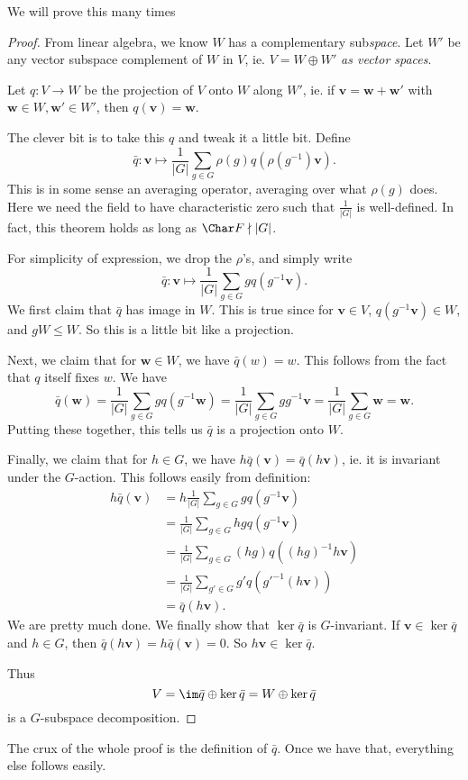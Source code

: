 \documentclass[a4paper]{article}
\begin{document}
We will prove this many times
\begin{proof}
  From linear algebra, we know $W$ has a complementary sub\emph{space}. Let $W'$ be any vector subspace complement of $W$ in $V$, ie. $V = W \oplus W'$ \emph{as vector spaces}.

  Let $q: V \to W$ be the projection of $V$ onto $W$ along $W'$, ie. if $\mathbf{v} = \mathbf{w} + \mathbf{w}'$ with $\mathbf{w} \in W, \mathbf{w}' \in W'$, then $q(\mathbf{v}) = \mathbf{w}$.

  The clever bit is to take this $q$ and tweak it a little bit. Define
  \[
    \bar{q}: \mathbf{v} \mapsto \frac{1}{|G|} \sum_{g \in G} \rho(g) q (\rho(g^{-1})\mathbf{v}).
  \]
  This is in some sense an averaging operator, averaging over what $\rho(g)$ does. Here we need the field to have characteristic zero such that $\frac{1}{|G|}$ is well-defined. In fact, this theorem holds as long as $\Char F \nmid |G|$.

  For simplicity of expression, we drop the $\rho$'s, and simply write
  \[
    \bar{q}: \mathbf{v} \mapsto \frac{1}{|G|} \sum_{g \in G} g q (g^{-1}\mathbf{v}).
  \]
  We first claim that $\bar{q}$ has image in $W$. This is true since for $\mathbf{v} \in V$, $q(g^{-1} \mathbf{v}) \in W$, and $gW \leq W$. So this is a little bit like a projection.

  Next, we claim that for $\mathbf{w} \in W$, we have $\bar{q}(w) = w$. This follows from the fact that $q$ itself fixes $w$. We have
  \[
    \bar{q}(\mathbf{w}) = \frac{1}{|G|} \sum_{g \in G} g q(g^{-1}\mathbf{w}) = \frac{1}{|G|} \sum_{g \in G} gg^{-1}\mathbf{v} = \frac{1}{|G|} \sum_{g \in G}\mathbf{w} = \mathbf{w}.
  \]
  Putting these together, this tells us $\bar{q}$ is a projection onto $W$.

  Finally, we claim that for $h \in G$, we have $h \bar{q}(\mathbf{v}) = \bar{q}(h\mathbf{v})$, ie. it is invariant under the $G$-action. This follows easily from definition:
  \begin{align*}
    h \bar{q} (\mathbf{v}) &= h\frac{1}{|G|} \sum_{g \in G} g q (g^{-1}\mathbf{v})\\
    &= \frac{1}{|G|} \sum_{g \in G} hg q (g^{-1} \mathbf{v})\\
    &= \frac{1}{|G|} \sum_{g \in G} (hg) q ((hg)^{-1} h\mathbf{v})\\
    &= \frac{1}{|G|} \sum_{g' \in G} g' q(g'^{-1}(h\mathbf{v}))\\
    &= \bar{q} (h\mathbf{v}).
  \end{align*}
  We are pretty much done. We finally show that $\ker \bar{q}$ is $G$-invariant. If $\mathbf{v} \in \ker \bar{q}$ and $h \in G$, then $\bar{q}(h\mathbf{v}) = h\bar{q}(\mathbf{v}) = 0$. So $h\mathbf{v} \in \ker \bar{q}$.

  Thus
  \[
    V = \im \bar{q} \oplus \ker \bar{q} = W \oplus \ker\bar{q}
  \]
  is a $G$-subspace decomposition.
\end{proof}
The crux of the whole proof is the definition of $\bar{q}$. Once we have that, everything else follows easily.
\end{document}
